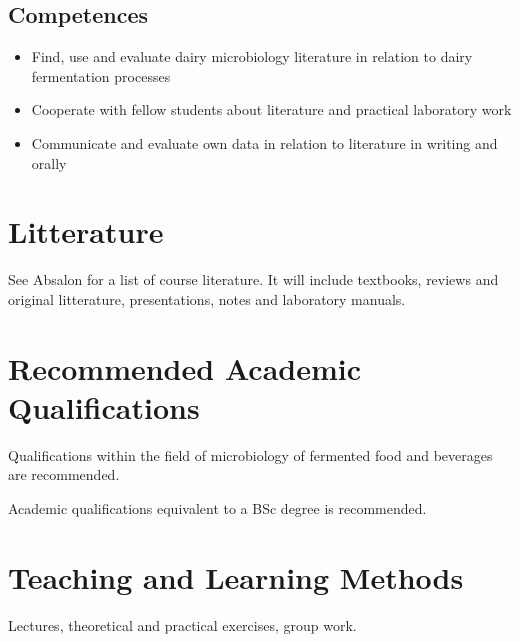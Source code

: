 \subsection{Competences}  
\begin{highlight}
    \begin{itemize}
        \item Find, use and evaluate dairy microbiology literature in relation to dairy fermentation processes

        \item Cooperate with fellow students about literature and practical laboratory work

        \item Communicate and evaluate own data in relation to literature in writing and orally
    \end{itemize}
\end{highlight}

\section{Litterature}
See Absalon for a list of course literature. It will include textbooks, reviews and original litterature, presentations, notes and laboratory manuals.

\section{Recommended Academic Qualifications}
Qualifications within the field of microbiology of fermented food and beverages are recommended.

Academic qualifications equivalent to a BSc degree is recommended.

\section{Teaching and Learning Methods}
Lectures, theoretical and practical exercises, group work.

